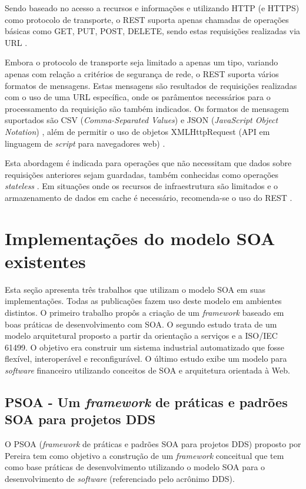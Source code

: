 Sendo baseado no acesso a recursos e informações e utilizando HTTP (e HTTPS) como protocolo de transporte, o REST suporta apenas chamadas de operações básicas como GET, PUT, POST, DELETE, sendo estas requisições realizadas via URL \cite{rozlog_restesoap_2013}.

Embora o protocolo de transporte seja limitado a apenas um tipo, variando apenas com relação a critérios de segurança de rede, o REST suporta vários formatos de mensagens. Estas mensagens são resultados de requisições realizadas com o uso de uma URL específica, onde os parâmentos necessários para o processamento da requisição são também indicados. Os formatos de mensagem suportados são CSV (\textit{Comma-Separated Values}) e JSON (\textit{JavaScript Object Notation}) \cite{mueller_understanding_2013}, além de permitir o uso de objetos XMLHttpRequest (API em linguagem de \textit{script} para navegadores web) \cite{rozlog_restesoap_2013}.

Esta abordagem é indicada para operações que não necessitam que dados sobre requisições anteriores sejam guardadas, também conhecidas como operações \textit{stateless} \cite{rozlog_restesoap_2013}. Em situações onde os recursos de infraestrutura são limitados e o armazenamento de dados em cache é necessário, recomenda-se o uso do REST \cite{rozlog_restesoap_2013}.

\section{Implementações do modelo SOA existentes}

Esta seção apresenta três trabalhos que utilizam o modelo SOA em suas implementações. Todas as publicações fazem uso deste modelo em ambientes distintos. O primeiro trabalho propôs a criação de um \textit{framework} baseado em boas práticas de desenvolvimento com SOA. O segundo estudo trata de um modelo arquitetural proposto a partir da orientação a serviços e a ISO/IEC 61499. O objetivo era construir um sistema industrial automatizado que fosse flexível, interoperável e reconfigurável. O último estudo exibe um modelo para \textit{software} financeiro utilizando conceitos de SOA e arquitetura orientada à Web.

\subsection{PSOA - Um \textit{framework} de práticas e padrões SOA para projetos DDS}

O PSOA (\textit{framework} de práticas e padrões SOA para projetos DDS) proposto por Pereira \cite{pereira_psoa_2011} tem como objetivo a construção de um \textit{framework} conceitual que tem como base práticas de desenvolvimento utilizando o modelo SOA para o desenvolvimento de \textit{software} (referenciado pelo acrônimo DDS). 

